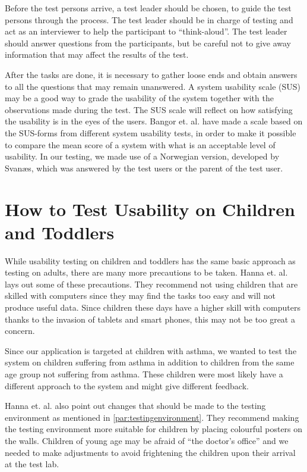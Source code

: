 Before the test persons arrive, a test leader should be chosen, to guide the test persons through the process. The test leader should be in charge of testing and act as an interviewer to help the participant to ``think-aloud''\cite{lewis1982using}. The test leader should answer questions from the participants, but be careful not to give away information that may affect the results of the test.

After the tasks are done, it is necessary to gather loose ends and obtain answers to all the questions that may remain unanswered. A system usability scale (SUS)\cite{sus} may be a good way to grade the usability of the system together with the observations made during the test. The SUS scale will reflect on how satisfying the usability is in the eyes of the users. Bangor et. al.\cite{susform} have made a scale based on the SUS-forms from different system usability tests, in order to make it possible to compare the mean score of a system with what is an acceptable level of usability. In our testing, we made use of a Norwegian version, developed by Svan\ae s, which was answered by the test users or the parent of the test user.


\section{How to Test Usability on Children and Toddlers}
\label{sec:usabilitytestchildren}
While usability testing on children and toddlers has the same basic approach as testing on adults, there are many more precautions to be taken. 
Hanna et. al.\cite{testingenvironmentforchildren} lays out some of these precautions. They recommend not using children that are skilled with computers since they may find the tasks too easy and will not produce useful data. 
Since children these days have a higher skill with computers thanks to the invasion of tablets and smart phones\cite{babiesusageoftablets}, this may not be too great a concern. 

Since our application is targeted at children with asthma, we wanted to test the system on children suffering from asthma in addition to children from the same age group not suffering from asthma. These children were most likely have a different approach to the system and might give different feedback.

Hanna et. al. also point out changes that should be made to the testing environment as mentioned in \ref{par:testingenvironment}. They recommend making the testing environment more suitable for children by placing colourful posters on the walls.
Children of young age may be afraid of ``the doctor's office'' and we needed to make adjustments to avoid frightening the children upon their arrival at the test lab. 

